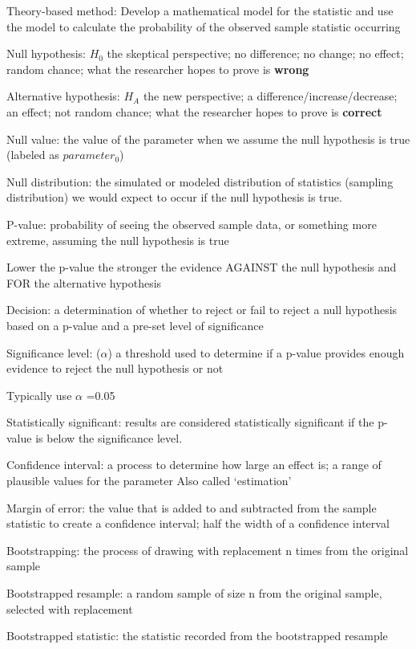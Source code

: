 \documentclass[
]{report}
\newcommand{\rgi}{\hspace{24pt}}  %
\begin{document}
Theory-based method: Develop a mathematical model for the statistic and use the model to calculate the probability of the observed sample statistic occurring

Null hypothesis: \(H_0\) the skeptical perspective; no difference; no change; no effect; random chance; what the researcher hopes to prove is \textbf{wrong}

Alternative hypothesis: \(H_A\) the new perspective; a difference/increase/decrease; an effect; not random chance; what the researcher hopes to prove is \textbf{correct}

Null value: the value of the parameter when we assume the null hypothesis is true (labeled as \(parameter_0\))

Null distribution: the simulated or modeled distribution of statistics (sampling distribution) we would expect to occur if the null hypothesis is true.

P-value: probability of seeing the observed sample data, or something more extreme, assuming the null hypothesis is true

\rgi Lower the p-value the stronger the evidence AGAINST the null hypothesis and FOR the alternative hypothesis

Decision: a determination of whether to reject or fail to reject a null hypothesis based on a p-value and a pre-set level of significance

Significance level: (\(\alpha\)) a threshold used to determine if a p-value provides enough evidence to reject the null hypothesis or not

\rgi Typically use \(\alpha\) =0.05

Statistically significant: results are considered statistically significant if the p-value is below the significance level.

Confidence interval: a process to determine how large an effect is; a range of plausible values for the parameter
\rgi Also called `estimation'

Margin of error: the value that is added to and subtracted from the sample statistic to create a confidence interval; half the width of a confidence interval

Bootstrapping: the process of drawing with replacement n times from the original sample

Bootstrapped resample: a random sample of size n from the original sample, selected with replacement

Bootstrapped statistic: the statistic recorded from the bootstrapped resample
\end{document}
